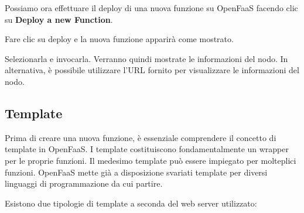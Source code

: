 \documentclass[11pt, a4paper]{article}
\begin{document}
Possiamo ora effettuare il deploy di una nuova funzione su OpenFaaS facendo clic su \textbf{Deploy a new Function}.



Fare clic su deploy e la nuova funzione apparirà come mostrato.


Selezionarla e invocarla. Verranno quindi mostrate le informazioni del nodo. In alternativa, è possibile utilizzare l'URL fornito per visualizzare le informazioni del nodo.



\subsection{Template}

Prima di creare una nuova funzione, è essenziale comprendere il concetto di template in OpenFaaS. I template costituiscono fondamentalmente un wrapper per le proprie funzioni. Il medesimo template può essere impiegato per molteplici funzioni. OpenFaaS mette già a disposizione svariati template per diversi linguaggi di programmazione da cui partire.

Esistono due tipologie di template a seconda del web server utilizzato:
\end{document}

